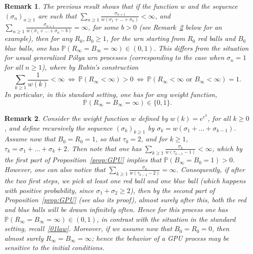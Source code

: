 \documentclass[10pt,a4paper]{amsart}
\newtheorem {rem} {Remark} [section]
\newcommand{\1}{{\text{\Large $\mathfrak 1$}}}
\begin{document}
\begin{rem} 
\em{The previous result shows that if the function $w$ and the sequence $(\sigma_n)_{n\ge 1}$ are such that $\sum_{n\ge 1} \frac {\sigma_{n+1}}{w(\sigma_1+\dots+\sigma_n)} <\infty$, and $\sum_{n\ge 1} \frac {\sigma_{n+1}}{w(\sigma_1+\dots+\sigma_n-b)} =\infty$, for some $b>0$ (see Remark~\ref{rem:ex} below for an example), then for any $R_0,B_0\ge 1$, for the urn starting from $R_0$ red balls and $B_0$ blue balls, one has $\mathbb P(R_\infty = B_\infty = \infty) \in (0,1)$. 
This differs from the situation for usual generalized P\'olya urn processes (corresponding to the case when $\sigma_n = 1$ for all $n\ge 1$), where by Rubin's construction~\cite{Dav}  
\begin{equation}\label{Rubin}
\sum_{k\ge 1} \frac 1{w(k)} <\infty \ \Longleftrightarrow \ \mathbb P(R_\infty <\infty ) >0 \ \Longleftrightarrow \ \mathbb P( R_\infty <\infty \text{ or }B_\infty <\infty) = 1.
\end{equation}
In particular, in this standard setting, one has for any weight function, 
\begin{equation}\label{01law}
\mathbb P(R_\infty = B_\infty = \infty) \in \{0,1\}.
\end{equation}
}
\end{rem}

\begin{rem}\label{rem:ex}\em{
Consider the weight function $w$ defined by $w(k) = e^{e^k}$, for all $k\ge 0$, and define recursively the sequence $(\sigma_k)_{k\ge 1}$ by $\sigma_k = 
w(\sigma_1+\dots+\sigma_{k-1})$. Assume now that $B_0 = R_0 = 1$, so that $\tau_0=2$, and for $k\ge 1$, $\tau_k = \sigma_1+\dots+\sigma_k +  2$. Then note that one has $\sum_{k\ge 1} \frac{\sigma_k}{w(\tau_{k-1}-1)}<\infty$, which by the first part of Proposition~\ref{prop:GPU} implies that $\mathbb P(B_\infty = B_0 = 1) >0$. However, one can also notice that  $\sum_{k\ge 1} \frac{\sigma_k}{w(\tau_{k-1}-2)}=\infty$. Consequently, 
if after the two first steps, we pick at least one red ball and one blue ball (which happens with positive probability, since $\sigma_1 +\sigma_2\ge 2$), then by the second part of Proposition~\ref{prop:GPU} (see also its proof), almost surely after this, both the red and blue balls will be drawn infinitely often. Hence for this process one has $\mathbb P(R_\infty = B_\infty = \infty) \in (0,1)$, in contrast with the situation in the standard setting, recall~\eqref{01law}. Moreover, if we assume now that $B_0 = R_0=0$, then almost surely $R_\infty = B_\infty = \infty$; hence the behavior of a GPU process may be sensitive to the initial conditions. }
\end{rem}
\end{document}
